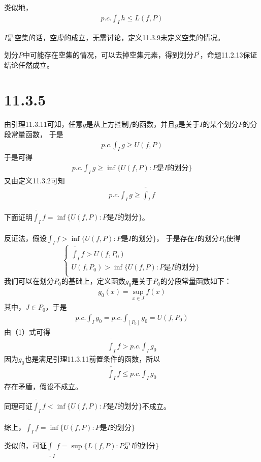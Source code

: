 \documentclass{article}
\begin{document}
类似地，
\begin{align*}
  p.c.\int_{I}h \leq L(f, P)
\end{align*}

\begin{zremark}
  $I$是空集的话，空虚的成立，无需讨论，定义11.3.9未定义空集的情况。

  划分$P$中可能存在空集的情况，可以去掉空集元素，得到划分$P^\prime$，命题11.2.13保证结论任然成立。
\end{zremark}

\section*{11.3.5}

由引理11.3.11可知，任意$g$是从上方控制$f$的函数，并且$g$是关于$I$的某个划分$P$的分段常量函数，
于是
\begin{align*}
  p.c.\int_{I}g \geq U(f, P)
\end{align*}
于是可得
\begin{align*}
  p.c.\int_{I}g \geq \inf\{U(f,P): P \text{是} I \text{的划分}\}
\end{align*}
又由定义11.3.2可知
\begin{align*}
  p.c.\int_{I}g \geq \overline{\int}_{I} f
\end{align*}

下面证明$\overline{\int}_{I} f  = \inf\{U(f,P): P \text{是} I \text{的划分}\}$。

反证法，假设$ \overline{\int}_{I} f  > \inf\{U(f,P): P \text{是} I \text{的划分}\}$，
于是存在$I$的划分$P_0$使得
\begin{equation}
  \begin{cases}
    \overline{\int}_{I} f  > U(f,P_0)                   \\
    U(f, P_0) > \inf\{U(f,P): P \text{是} I \text{的划分}\} \\
  \end{cases}
\end{equation}
我们可以在划分$P_0$的基础上，定义函数$g_0$是关于$P_0$的分段常量函数如下：
\begin{align*}
  g_0(x) = \sup\limits_{x \in J}f(x)
\end{align*}
其中，$J \in P_0$，于是
\begin{align*}
  p.c.\int_{I}g_0 = p.c.\int_{[P_0]}g_0 = U(f, P_0)
\end{align*}
由（1）式可得
\begin{align*}
  \overline{\int}_{I} f  > p.c.\int_{I}g_0
\end{align*}
因为$g_0$也是满足引理11.3.11前置条件的函数，所以
\begin{align*}
  \overline{\int}_{I} f \leq p.c.\int_{I}g_0
\end{align*}
存在矛盾，假设不成立。

同理可证$\overline{\int}_{I} f  < \inf\{U(f,P): P \text{是} I \text{的划分}\}$不成立。

综上，$\overline{\int}_{I} f  = \inf\{U(f,P): P \text{是} I \text{的划分}\}$

类似的，可证$\underline{\int}_I  f = \sup\{L(f,P): P \text{是} I \text{的划分}\}$
\end{document}
